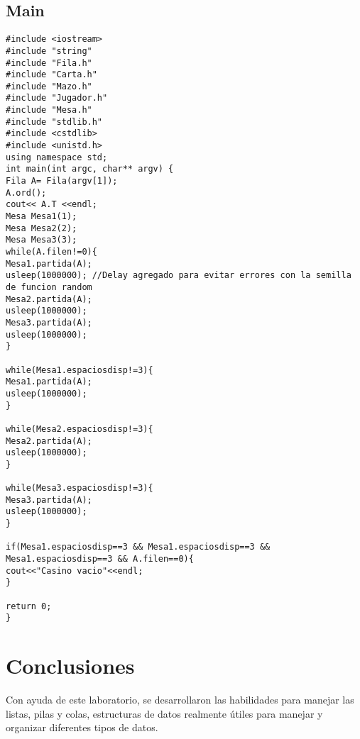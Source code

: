 \documentclass[11pt]{article}
\begin{document}
\subsection{Main}
\begin{lstlisting}
#include <iostream>
#include "string"
#include "Fila.h"
#include "Carta.h"
#include "Mazo.h"
#include "Jugador.h"
#include "Mesa.h"
#include "stdlib.h"   
#include <cstdlib>
#include <unistd.h>
using namespace std;
int main(int argc, char** argv) {
Fila A= Fila(argv[1]);
A.ord();
cout<< A.T <<endl;
Mesa Mesa1(1);
Mesa Mesa2(2);
Mesa Mesa3(3);
while(A.filen!=0){
Mesa1.partida(A);
usleep(1000000); //Delay agregado para evitar errores con la semilla de funcion random
Mesa2.partida(A);
usleep(1000000);
Mesa3.partida(A);
usleep(1000000);
}

while(Mesa1.espaciosdisp!=3){
Mesa1.partida(A);
usleep(1000000);
}

while(Mesa2.espaciosdisp!=3){
Mesa2.partida(A);
usleep(1000000);
}

while(Mesa3.espaciosdisp!=3){
Mesa3.partida(A);
usleep(1000000);
}

if(Mesa1.espaciosdisp==3 && Mesa1.espaciosdisp==3 && Mesa1.espaciosdisp==3 && A.filen==0){
cout<<"Casino vacio"<<endl;
}

return 0;
}

\end{lstlisting}

\section{Conclusiones}
Con ayuda de este laboratorio, se desarrollaron las habilidades para manejar las listas, pilas y colas, estructuras de datos realmente útiles para manejar y organizar diferentes tipos de datos.
\end{document}
